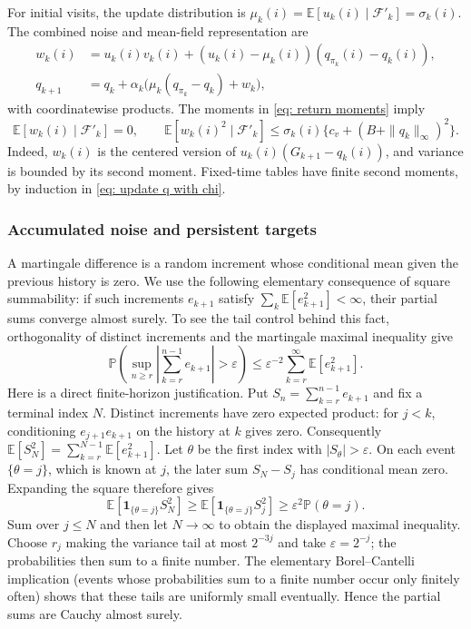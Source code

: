 For initial visits, the update distribution is $\mu_k(i)=\mathbb E[u_k(i)\mid\mathcal F'_k]=\sigma_k(i)$. The combined noise and mean-field representation are
\begin{align}
 w_k(i)&=u_k(i)v_k(i)+(u_k(i)-\mu_k(i))(q_{\pi_k}(i)-q_k(i)),\label{eq: definition combined noise}\\
 q_{k+1}&=q_k+\alpha_k\bigl(\mu_k(q_{\pi_k}-q_k)+w_k\bigr),\label{eq: mcopi sa}
\end{align}
with coordinatewise products. The moments in \eqref{eq: return moments} imply
\begin{equation}\label{eq: combined moments}
\mathbb E[w_k(i)\mid\mathcal F'_k]=0,\qquad
\mathbb E[w_k(i)^2\mid\mathcal F'_k]\le\sigma_k(i)\{c_v+(B+\|q_k\|_\infty)^2\}.
\end{equation}
Indeed, $w_k(i)$ is the centered version of $u_k(i)(G_{k+1}-q_k(i))$, and variance is bounded by its second moment. Fixed-time tables have finite second moments, by induction in \eqref{eq: update q with chi}.

\subsubsection{Accumulated noise and persistent targets}\label{sec: replacement foundations}
A martingale difference is a random increment whose conditional mean given the previous history is zero. We use the following elementary consequence of square summability: if such increments $e_{k+1}$ satisfy $\sum_k\mathbb E[e_{k+1}^2]<\infty$, their partial sums converge almost surely. To see the tail control behind this fact, orthogonality of distinct increments and the martingale maximal inequality give
\[
\mathbb P\left(\sup_{n\ge r}\left|\sum_{k=r}^{n-1}e_{k+1}\right|>\varepsilon\right)
\le\varepsilon^{-2}\sum_{k=r}^\infty\mathbb E[e_{k+1}^2].
\]
Here is a direct finite-horizon justification. Put $S_n=\sum_{k=r}^{n-1}e_{k+1}$ and fix a terminal index $N$. Distinct increments have zero expected product: for $j<k$, conditioning $e_{j+1}e_{k+1}$ on the history at $k$ gives zero. Consequently $\mathbb E[S_N^2]=\sum_{k=r}^{N-1}\mathbb E[e_{k+1}^2]$. Let $\theta$ be the first index with $|S_\theta|>\varepsilon$. On each event $\{\theta=j\}$, which is known at $j$, the later sum $S_N-S_j$ has conditional mean zero. Expanding the square therefore gives
\[
\mathbb E[\mathbf1_{\{\theta=j\}}S_N^2]
\ge\mathbb E[\mathbf1_{\{\theta=j\}}S_j^2]
\ge\varepsilon^2\mathbb P(\theta=j).
\]
Sum over $j\le N$ and then let $N\to\infty$ to obtain the displayed maximal inequality. Choose $r_j$ making the variance tail at most $2^{-3j}$ and take $\varepsilon=2^{-j}$; the probabilities then sum to a finite number. The elementary Borel--Cantelli implication (events whose probabilities sum to a finite number occur only finitely often) shows that these tails are uniformly small eventually. Hence the partial sums are Cauchy almost surely.

